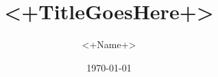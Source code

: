 \documentclass{beamer}
\title[]{<+TitleGoesHere+>} %
\author{<+Name+>} %
\institute[<+Institution+>] %
{University of Michigan \\ %
\medskip
 \textit{<+email+>} %
}\date{\today} %
\newcommand{\2}{\textbf{2}}
\newcommand{\1}{\textbf{1}}
\begin{document}
\begin{frame}
\titlepage %
\end{frame}
\end{document}
